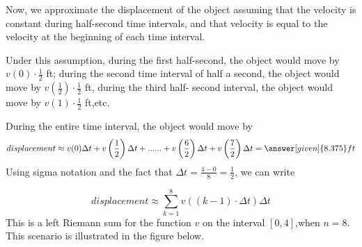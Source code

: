 \documentclass{ximera}
\begin{document}
\begin{example}
\begin{explanation}
\begin{image}
\end{image}
Now, we approximate the displacement of the object assuming that the velocity is constant during half-second time intervals, and that velocity is equal to the velocity at the beginning of each time interval.


 Under this assumption,  during the first half-second, the object would move by $v(0)\cdot\frac{1}{2}$ ft;  during the second time interval of half a  second, the object would move by $v\left(\frac{1}{2}\right)\cdot\frac{1}{2}$ ft, during the third half- second interval, the object would move by $v(1)\cdot\frac{1}{2}$ ft,etc. 
 
 
 During the entire time interval, the object would move by
\begin{align*}
   displacement \approx v(0)\Delta t+v\left(\frac{1}{2}\right)\Delta t+ ...... +v\left(\frac{6}{2}\right)\Delta t+v\left(\frac{7}{2}\right)\Delta t
   =\answer[given]{8.375} ft 
\end{align*}
Using sigma notation and the fact that $\Delta t=\frac{4-0}{8}=\frac{1}{2}$, we can write

  \[
   displacement\approx \sum_{k=1}^8v((k-1)\cdot\Delta t)\Delta t
\]
  This is a left Riemann sum for the function $v$ on the interval $[0,4]$,when $n=8$.
This scenario is illustrated in the figure below.


\end{explanation}
\end{example}
\end{document}
